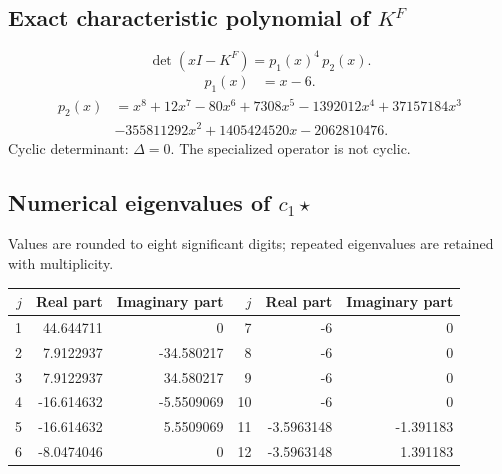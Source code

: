\documentclass[10pt,a4paper]{article}
\begin{document}
\subsection*{Exact characteristic polynomial of $K^F$}
\[\det(xI-K^F)=p_{1}(x)^{4}\,p_{2}(x).\]
\[\begin{aligned}p_{1}(x)&=x - 6.\end{aligned}\]
\[\begin{aligned}p_{2}(x)&=x^{8} + 12 x^{7} - 80 x^{6} + 7308 x^{5} - 1392012 x^{4} + 37157184 x^{3}\\&- 355811292 x^{2} + 1405424520 x - 2062810476.\end{aligned}\]
Cyclic determinant: $\Delta=0$. The specialized operator is not cyclic.
\subsection*{Numerical eigenvalues of $c_1\star$}
Values are rounded to eight significant digits; repeated eigenvalues are retained with multiplicity.
\begin{center}\small\begin{tabular}{rrr@{\qquad}rrr}\toprule $j$ & Real part & Imaginary part & $j$ & Real part & Imaginary part\\\midrule
1 & 44.644711 & 0 & 7 & -6 & 0\\
2 & 7.9122937 & -34.580217 & 8 & -6 & 0\\
3 & 7.9122937 & 34.580217 & 9 & -6 & 0\\
4 & -16.614632 & -5.5509069 & 10 & -6 & 0\\
5 & -16.614632 & 5.5509069 & 11 & -3.5963148 & -1.391183\\
6 & -8.0474046 & 0 & 12 & -3.5963148 & 1.391183\\
\bottomrule\end{tabular}\end{center}
\end{document}
